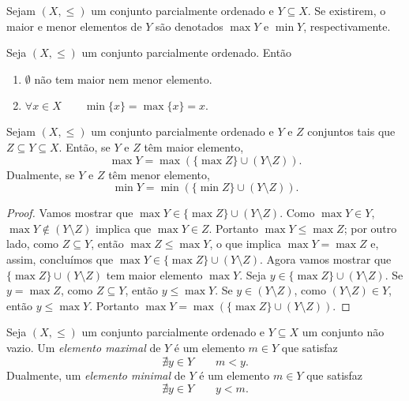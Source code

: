 \begin{notation}
	Sejam $(X,\leq)$ um conjunto parcialmente ordenado e $Y \subseteq X$. Se existirem, o maior e menor elementos de $Y$ são denotados $\max Y$ e $\min Y$, respectivamente.
\end{notation}

\begin{proposition}
	Seja $(X,\leq)$ um conjunto parcialmente ordenado. Então
	\begin{enumerate}
	\item $\emptyset$ não tem maior  nem menor elemento.
	\item $\forall x \in X \qquad \min\{x\}=\max\{x\} = x.$
	\end{enumerate}
\end{proposition}

\begin{proposition}
	Sejam $(X,\leq)$ um conjunto parcialmente ordenado e $Y$ e $Z$ conjuntos tais que $Z \subseteq Y \subseteq X$. Então, se $Y$ e $Z$ têm maior elemento,
	\begin{equation*}
	\max Y = \max(\{\max Z\} \cup (Y \setminus Z)).
	\end{equation*}
Dualmente, se $Y$ e $Z$ têm menor elemento,
	\begin{equation*}
	\min Y = \min(\{\min Z\} \cup (Y \setminus Z)).
	\end{equation*}
\end{proposition}
\begin{proof}
	Vamos mostrar que $\max Y \in \{\max Z\} \cup (Y \setminus Z)$. Como $\max Y \in Y$, $\max Y \notin (Y \setminus Z)$ implica que $\max Y \in Z$. Portanto $\max Y \leq \max Z$; por outro lado, como $Z \subseteq Y$, então $\max Z \leq \max Y$, o que implica $\max Y = \max Z$ e, assim, concluímos que $\max Y \in \{\max Z\} \cup (Y \setminus Z)$. Agora vamos mostrar que $\{\max Z\} \cup (Y \setminus Z)$ tem maior elemento $\max Y$. Seja $y \in \{\max Z\} \cup (Y \setminus Z)$. Se $y = \max Z$, como $Z \subseteq Y$, então $y \leq \max Y$. Se $y \in (Y \setminus Z)$, como $(Y \setminus Z) \in Y$, então $y \leq \max Y$. Portanto $\max Y = \max(\{\max Z\} \cup (Y \setminus Z))$.
\end{proof}

\begin{definition}
	Seja $(X,\leq)$ um conjunto parcialmente ordenado e $Y \subseteq X$ um conjunto não vazio. Um \emph{elemento maximal} de $Y$ é um elemento $m \in Y$ que satisfaz
	\begin{equation*}
	\nexists y \in Y \qquad m < y.
	\end{equation*}
Dualmente, um \emph{elemento minimal} de $Y$ é um elemento $m \in Y$ que satisfaz
	\begin{equation*}
	\nexists y \in Y \qquad y < m.
	\end{equation*}
\end{definition}

